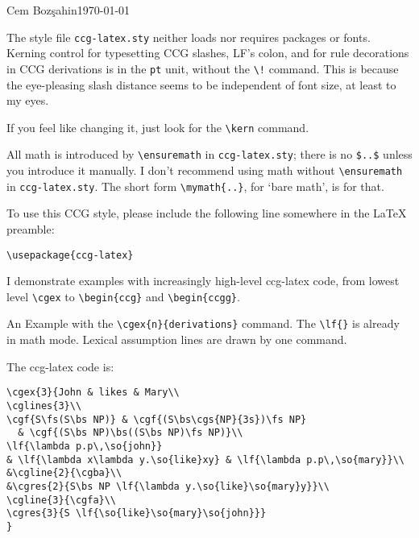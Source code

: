\documentclass[11pt]{article}
\begin{document}
\hfill{\small Cem Boz\c{s}ahin}\hfill\today\medskip\bigskip

\noindent The style file \verb|ccg-latex.sty| neither loads nor requires  packages or fonts. Kerning control for typesetting CCG slashes, LF's colon, and for rule decorations in CCG derivations is in the \verb|pt| unit, without the \verb|\!| command. This is because the eye-pleasing slash distance seems to be independent of font size, at least to my eyes.

If you feel like changing it, just look for the \verb|\kern| command. 

All math is introduced by \verb|\ensuremath| in \verb|ccg-latex.sty|; 
there is no \verb|$..$| unless you introduce it manually. I don't recommend
using math without \verb|\ensuremath| in \verb|ccg-latex.sty|.
The short form \verb|\mymath{..}|, for `bare math', is for that.

To use this CCG style, please include the following line somewhere in the \LaTeX\,preamble:\medskip

\begin{verbatim}
\usepackage{ccg-latex}
\end{verbatim}\medskip

I demonstrate examples with increasingly high-level ccg-latex code, from lowest
level \verb|\cgex| to \verb|\begin{ccg}| and \verb|\begin{ccgg}|.\bigskip

An Example with the \verb|\cgex{n}{derivations}| command. The \verb|\lf{}| is already in math mode.
Lexical assumption lines are drawn by one command.
\bigskip

\medskip\bigskip

The ccg-latex code is:

\begin{verbatim}
\cgex{3}{John & likes & Mary\\
\cglines{3}\\
\cgf{S\fs(S\bs NP)} & \cgf{(S\bs\cgs{NP}{3s})\fs NP} 
  & \cgf{(S\bs NP)\bs((S\bs NP)\fs NP)}\\
\lf{\lambda p.p\,\so{john}} 
& \lf{\lambda x\lambda y.\so{like}xy} & \lf{\lambda p.p\,\so{mary}}\\
&\cgline{2}{\cgba}\\
&\cgres{2}{S\bs NP \lf{\lambda y.\so{like}\so{mary}y}}\\  
\cgline{3}{\cgfa}\\
\cgres{3}{S \lf{\so{like}\so{mary}\so{john}}}
}
\end{verbatim}
\newpage
\end{document}
